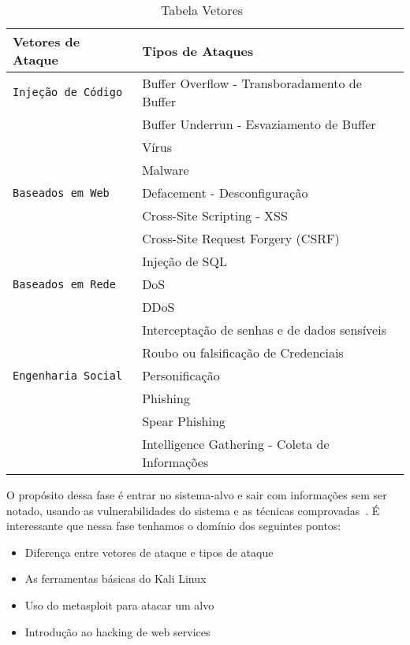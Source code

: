 \begin{table}
\begin{center}

\begin{tabular}{ll}
\hline
\textbf{Vetores de Ataque} 	  & \textbf{Tipos de Ataques} \\
\hline
\texttt{Injeção de Código} 	 & Buffer Overflow - Transboradamento de Buffer \\
\texttt{} 	 & Buffer Underrun - Esvaziamento de Buffer \\
\texttt{} 	 & Vírus \\
\texttt{} 	 & Malware \\
\texttt{Baseados em Web}	 & Defacement - Desconfiguração \\
\texttt{}	 & Cross-Site Scripting - XSS \\
\texttt{}	 & Cross-Site Request Forgery (CSRF) \\
\texttt{}	 & Injeção de SQL \\			
\texttt{Baseados em Rede}	 & DoS \\

\texttt{}	 & DDoS \\
\texttt{}	 & Interceptação de senhas e de dados sensíveis \\
\texttt{}	 & Roubo ou falsificação de Credenciais \\
\texttt{Engenharia Social}	 &  Personificação\\
\texttt{ }	 &  Phishing\\
\texttt{ }	 &  Spear Phishing\\
\texttt{ }	 &  Intelligence Gathering - Coleta de Informações\\

\hline
\end{tabular}

\end{center}
\caption{Tabela Vetores~\cite{broad}}
\label{tab:Vetores de Ataques}
\end{table}

O propósito dessa fase é entrar no sistema-alvo e sair com informações sem ser notado, usando as vulnerabilidades do sistema e as técnicas comprovadas~\cite{broad}. É interessante que nessa fase tenhamos o domínio dos seguintes pontos:

\begin{itemize}
\item Diferença entre vetores de ataque e tipos de ataque
\item As ferramentas básicas do Kali Linux
\item Uso do metasploit para atacar um alvo
\item Introdução ao hacking de web services
\end{itemize}



